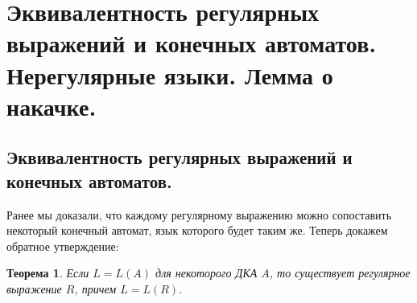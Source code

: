 \documentclass[a4paper,12pt]{article}
\newtheorem*{theorem}{Теорема}
\begin{document}
\section{Эквивалентность регулярных выражений и конечных автоматов. Нерегулярные языки. Лемма о накачке.}
	\subsection{Эквивалентность регулярных выражений и конечных автоматов.}
	Ранее мы доказали, что каждому регулярному выражению можно сопоставить некоторый конечный автомат, язык которого будет таким же. Теперь докажем обратное утверждение:
	\begin{theorem}
		Если \(L = L(A)\) для некоторого ДКА \(A\), то существует регулярное выражение \(R\), причем \(L = L(R)\).
	\end{theorem}
\end{document}
